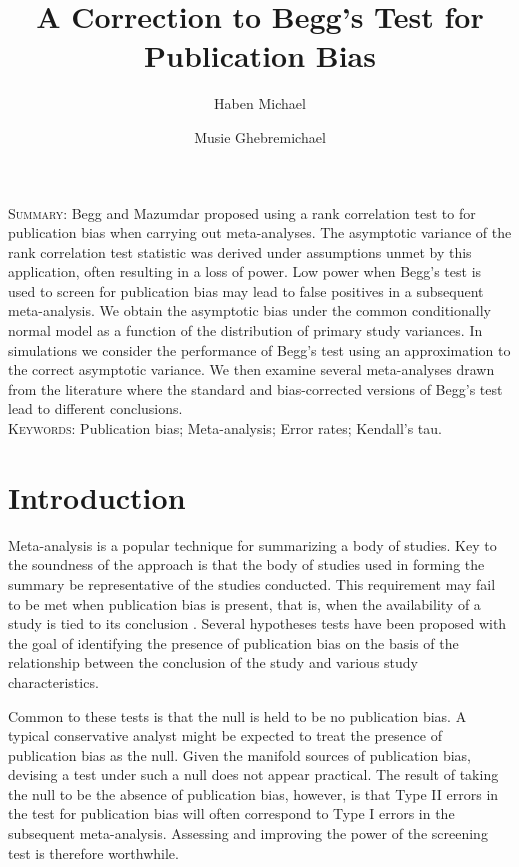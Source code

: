 \documentclass[12pt]{article}
\title{A Correction to Begg's Test for Publication Bias}
\author[1]{Haben Michael}
\author[2]{Musie Ghebremichael}
\affil[1]{University of Massachusetts, Amherst, MA (hmichael@math.umass.edu)}
\affil[2]{Ragon Institute and Harvard University, Cambridge, MA (musie\_ghebremichael@dfci.harvard.edu)}
\date{}
\begin{document}
\maketitle

\noindent \textsc{Summary}: Begg and Mazumdar proposed using a rank correlation test to
for publication bias when carrying out meta-analyses. The asymptotic
variance of the rank correlation test statistic was derived under
assumptions unmet by this application, often resulting in a loss of
power. Low power when Begg's test is used to screen for publication
bias may lead to false positives in a subsequent meta-analysis. We
obtain the asymptotic bias under the common conditionally normal model
as a function of the distribution of primary study variances. In
simulations we consider the performance of Begg's test using an
approximation to the correct asymptotic variance. We then examine
several meta-analyses drawn from the literature where the standard and
bias-corrected versions of Begg's test lead to different conclusions.\\
\textsc{Keywords}: Publication bias; Meta-analysis; Error rates; Kendall's tau.

\section{Introduction}

  Meta-analysis is a popular technique for summarizing a body of
  studies. Key to the soundness of the approach is that the body of
  studies used in forming the summary be representative of the studies conducted. This
  requirement may fail to be met when publication bias is present, that is,
  when the availability of a study is tied to its conclusion \citep{begg1994b}. Several
  hypotheses tests have been proposed with the goal of identifying the
  presence of publication bias on the basis of the relationship
  between the conclusion of the study and various study
  characteristics.
  
  Common to these tests is that the null is held to be no publication
  bias. A typical conservative analyst might be expected to treat the
  presence of publication bias as the null. Given the manifold sources
  of publication bias, devising a test under such a null does not
  appear practical. The result of taking the null to be the absence of
  publication bias, however, is that Type II errors in the test for
  publication bias will often correspond to Type I errors in the
  subsequent meta-analysis. Assessing and improving the power of the
  screening test is therefore worthwhile.
\end{document}
